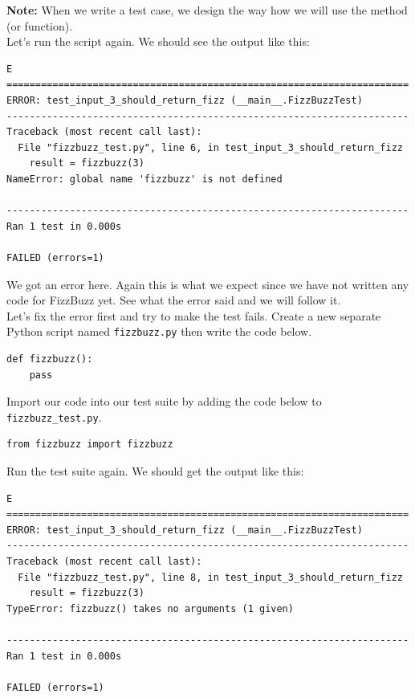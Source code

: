 \documentclass{article}
\begin{document}
\noindent \textbf{Note:} When we write a test case, we design the way how we
will use the method (or function). \\

\noindent Let's run the script again. We should see the output like this:

\begin{verbatim}
E
======================================================================
ERROR: test_input_3_should_return_fizz (__main__.FizzBuzzTest)
----------------------------------------------------------------------
Traceback (most recent call last):
  File "fizzbuzz_test.py", line 6, in test_input_3_should_return_fizz
    result = fizzbuzz(3)
NameError: global name 'fizzbuzz' is not defined

----------------------------------------------------------------------
Ran 1 test in 0.000s

FAILED (errors=1)
\end{verbatim}

\noindent We got an error here. Again this is what we expect since we have not
written any code for FizzBuzz yet. See what the error said and we will follow
it. \\

\noindent Let's fix the error first and try to make the test fails. Create a
new separate Python script named {\tt fizzbuzz.py} then write the code below.

\begin{verbatim}
def fizzbuzz():
    pass
\end{verbatim}

\noindent Import our code into our test suite by adding the code below to {\tt
fizzbuzz\_test.py}.

\begin{verbatim}
from fizzbuzz import fizzbuzz
\end{verbatim}

\noindent Run the test suite again. We should get the output like this:

\begin{verbatim}
E
======================================================================
ERROR: test_input_3_should_return_fizz (__main__.FizzBuzzTest)
----------------------------------------------------------------------
Traceback (most recent call last):
  File "fizzbuzz_test.py", line 8, in test_input_3_should_return_fizz
    result = fizzbuzz(3)
TypeError: fizzbuzz() takes no arguments (1 given)

----------------------------------------------------------------------
Ran 1 test in 0.000s

FAILED (errors=1)
\end{verbatim}
\end{document}
